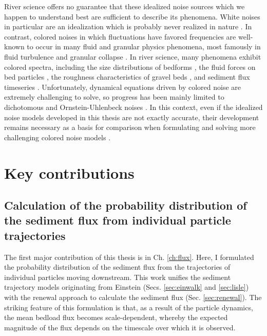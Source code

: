 River science offers no guarantee that these idealized noise sources which we happen to understand best are sufficient to describe its phenomena.
White noises in particular are an idealization which is probably never realized in nature \citep{Gardiner1983,Kubo1978}.
In contrast, colored noises in which fluctuations have favored frequencies are well-known to occur in many fluid and granular physics phenomena, most famously in fluid turbulence \citep{Kolmogorov1941,Nikora2000} and granular collapse \citep{Bak1987,Jensen1998}.
In river science, many phenomena exhibit colored spectra, including the size distributions of bedforms \citep{Nikora1997,Guala2014}, the fluid forces on bed particles \citep{Dwivedi2011, Amir2014}, the roughness characteristics of gravel beds \citep{Aberle2006,Singh2012}, and sediment flux timeseries \citep{Dhont2018,Chartrand2021}.
Unfortunately, dynamical equations driven by colored noise are extremely challenging to solve, so progress has been mainly limited to dichotomous and Ornstein-Uhlenbeck noises \citep{Hanggi1978,Luczka2005,Hanggi2007}. 
In this context, even if the idealized noise models developed in this thesis are not exactly accurate, their development remains necessary as a basis for comparison when formulating and solving more challenging colored noise models \citep[e.g.][]{Fox1986,Moss1989}.

\section{Key contributions}

\subsection{Calculation of the probability distribution of the sediment flux from individual particle trajectories}

The first major contribution of this thesis is in Ch. \ref{ch:flux}. Here, I formulated the probability distribution of the sediment flux from the trajectories of individual particles moving downstream. This work unifies the sediment trajectory models originating from Einstein (Secs. \ref{sec:einwalk} and \ref{sec:lisle}) with the renewal approach to calculate the sediment flux (Sec. \ref{sec:renewal}).
The striking feature of this formulation is that, as a result of the particle dynamics, the mean bedload flux becomes scale-dependent, whereby the expected magnitude of the flux depends on the timescale over which it is observed.

